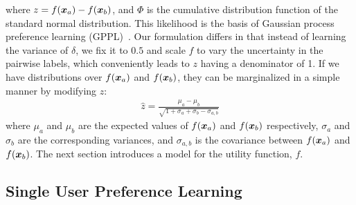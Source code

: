 where $z = f(\boldsymbol x_a) - f(\boldsymbol x_b)$,
and $\Phi$ is the cumulative distribution function of the standard normal distribution. 
This likelihood is the basis of Gaussian process preference learning (GPPL)~\citep{chu2005preference}. 
Our formulation differs in that instead of learning the variance of $\delta$, we fix it 
to $0.5$ and scale $f$ to vary the uncertainty in the pairwise labels,
which conveniently leads to $z$ having a denominator of 1.
If we have distributions over $f(\boldsymbol x_a)$ and $f(\boldsymbol x_b)$, they can be marginalized in a simple manner %
by modifying $z$:
\begin{align}
\hat{z} = \frac{\mu_a - \mu_b}{\sqrt{1 + \sigma_a + \sigma_b - \sigma_{a,b}} } \label{eq:predict_z}
\end{align}
where $\mu_a$ and $\mu_b$ are the expected values of $f(\boldsymbol x_a)$ and $f(\boldsymbol x_b)$ respectively, 
$\sigma_a$ and $\sigma_b$ are the corresponding variances,
and $\sigma_{a,b}$ is the covariance between $f(\boldsymbol x_a)$ and $f(\boldsymbol x_b)$.
The next section introduces a model for the utility function, $f$.

\subsection{Single User Preference Learning}

